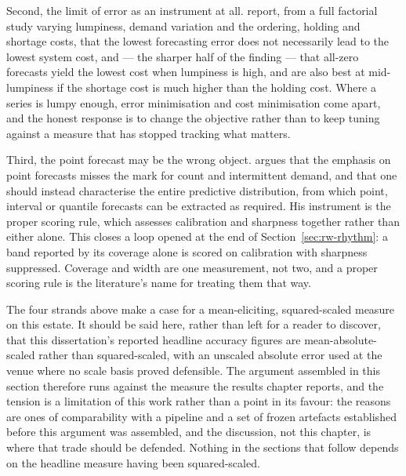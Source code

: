 Second, the limit of error as an instrument at all.
\citet{chatfield_all-zero_2007} report, from a full factorial study varying
lumpiness, demand variation and the ordering, holding and shortage costs, that
the lowest forecasting error does not necessarily lead to the lowest system
cost, and --- the sharper half of the finding --- that all-zero forecasts yield
the lowest cost when lumpiness is high, and are also best at mid-lumpiness if
the shortage cost is much higher than the holding cost. Where a series is lumpy
enough, error minimisation and cost minimisation come apart, and the honest
response is to change the objective rather than to keep tuning against a
measure that has stopped tracking what matters.

Third, the point forecast may be the wrong object.
\citet{kolassa_evaluating_2016} argues that the emphasis on point forecasts
misses the mark for count and intermittent demand, and that one should instead
characterise the entire predictive distribution, from which point, interval or
quantile forecasts can be extracted as required. His instrument is the proper
scoring rule, which assesses calibration and sharpness together rather than
either alone. This closes a loop opened at the end of
Section~\ref{sec:rw-rhythm}: a band reported by its coverage alone is scored on
calibration with sharpness suppressed. Coverage and width are one measurement,
not two, and a proper scoring rule is the literature's name for treating them
that way.

The four strands above make a case for a mean-eliciting, squared-scaled measure
on this estate. It should be said here, rather than left for a reader to
discover, that this dissertation's reported headline accuracy figures are
mean-absolute-scaled rather than squared-scaled, with an unscaled absolute
error used at the venue where no scale basis proved defensible. The argument
assembled in this section therefore runs against the measure the results
chapter reports, and the tension is a limitation of this work rather than a
point in its favour: the reasons are ones of comparability with a pipeline and
a set of frozen artefacts established before this argument was assembled, and
the discussion, not this chapter, is where that trade should be defended.
Nothing in the sections that follow depends on the headline measure having been
squared-scaled.

